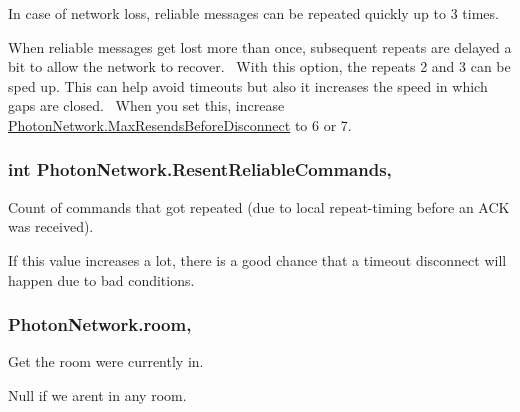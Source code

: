 In case of network loss, reliable messages can be repeated quickly up to 3 times. 

When reliable messages get lost more than once, subsequent repeats are delayed a bit to allow the network to recover.~\newline
 With this option, the repeats 2 and 3 can be sped up. This can help avoid timeouts but also it increases the speed in which gaps are closed.~\newline
 When you set this, increase \hyperlink{class_photon_network_ad86d4af661dd7365f6e172e106ca7cb2}{Photon\+Network.\+Max\+Resends\+Before\+Disconnect} to 6 or 7. 
\subsubsection[{\texorpdfstring{Resent\+Reliable\+Commands}{ResentReliableCommands}}]{\setlength{\rightskip}{0pt plus 5cm}int Photon\+Network.\+Resent\+Reliable\+Commands\hspace{0.3cm}{\ttfamily [static]}, {\ttfamily [get]}}\hypertarget{class_photon_network_aaaf92ee5eec22fff548ee9bb735913b6}{}\label{class_photon_network_aaaf92ee5eec22fff548ee9bb735913b6}


Count of commands that got repeated (due to local repeat-\/timing before an A\+CK was received). 

If this value increases a lot, there is a good chance that a timeout disconnect will happen due to bad conditions. 
\subsubsection[{\texorpdfstring{room}{room}}]{ Photon\+Network.\+room\hspace{0.3cm}{\ttfamily [static]}, {\ttfamily [get]}}\hypertarget{class_photon_network_ac7c6623c88f254b965aa366b1229781e}{}\label{class_photon_network_ac7c6623c88f254b965aa366b1229781e}


Get the room we\textquotesingle{}re currently in. 

Null if we aren\textquotesingle{}t in any room. 
